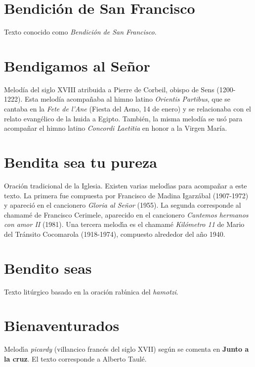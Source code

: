 \documentclass[landscape,12pt]{report}
\begin{document}
\section*{\small Bendici\'on de San Francisco} \noindent Texto conocido como \textit{Bendici\'on de San Francisco}.
\section*{\small Bendigamos al Señor} \noindent Melodía del siglo XVIII atribuida a Pierre de Corbeil, obispo de Sens (1200-1222). Esta melodía acompañaba al himno latino \textit{Orientis Partibus}, que se cantaba en la \emph{Fete de l’Ane} (Fiesta del Asno, 14 de enero) y se relacionaba con el relato evangélico de la huida a Egipto. También, la misma melodía se usó para acompañar el himno latino \emph{Concordi Laetitia} en honor a la Virgen María. 
\section*{\small Bendita sea tu pureza} \noindent\footnotesize Oraci\'on tradicional de la Iglesia. Existen varias melod\'\i as para acompa\~nar a este texto. La primera fue compuesta por Francisco de Madina Igarz\'abal (1907-1972) y apareci\'o en el cancionero \emph{Gloria al Se\~nor} (1955). La segunda corresponde al chamam\'e de Francisco Cerimele, aparecido en el cancionero \emph{Cantemos hermanos con amor II} (1981). Una tercera melod\'\i a es el chamam\'e \emph{Kil\'ometro 11} de Mario del Tr\'ansito Cocomarola (1918-1974), compuesto alrededor del a\~no 1940.
\section*{\small Bendito seas} \noindent Texto lit\'urgico basado en la oraci\'on rab\'\i nica del \textit{hamotzi}.
\section*{\small Bienaventurados} \noindent Melod\'\i a \textit{picardy} (villancico franc\'es del siglo XVII) seg\'un se comenta en \textbf{Junto a la cruz}. El texto corresponde a Alberto Taul\'e.
\end{document}
